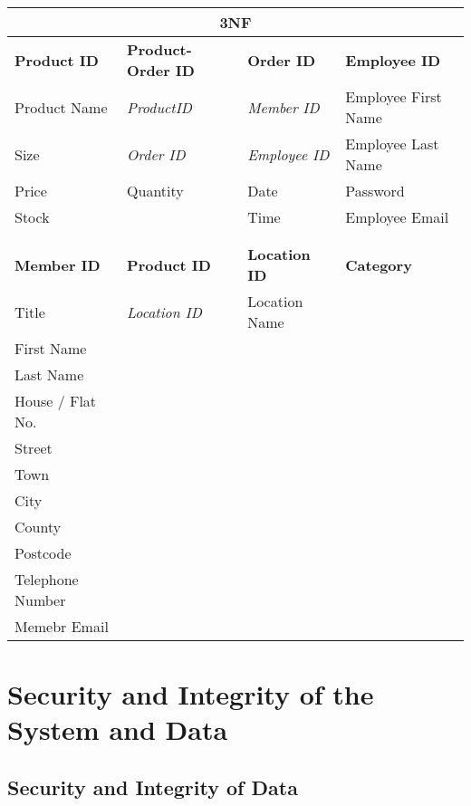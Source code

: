 \begin{flushleft}
\begin{center}
    \begin{tabular}{|p{3cm}|p{3cm}|p{3cm}|p{2cm}|}
        \hline
	 \multicolumn{4}{|c|}{3NF} \\ \hline
	\textbf{Product ID}  & \textbf{Product-Order ID} & \textbf{Order ID} & \textbf{Employee ID} \\ \hline
	{Product Name} & \textit{ProductID} & \textit{Member ID} & {Employee First Name} \\ \hline
	{Size} & \textit{Order ID} & \textit{Employee ID} & {Employee Last Name} \\ \hline
	{Price} & {Quantity} & {Date} & {Password} \\ \hline
	{Stock} & {} & {Time} & {Employee Email} \\ \hline
	{} & {} & {} & {}\\ \hline
	{} & {} & {} & {}\\ \hline
	\textbf{Member ID} & \textbf{Product ID} & \textbf{Location ID} & \textbf{Category}\\ \hline
	{Title} & \textit{Location ID} & {Location Name} & {}\\ \hline
	{First Name} & {} & {} & {}\\ \hline
	{Last Name} & {} & {} & {}\\ \hline
	{House / Flat No.} & {} & {} & {}\\ \hline
	{Street} & {} & {} & {}\\ \hline
	{Town} & {} & {} & {}\\ \hline
	{City} & {} & {} & {}\\ \hline
	{County} & {} & {} & {}\\ \hline
	{Postcode} & {} & {} & {}\\ \hline
	{Telephone Number} & {} & {} & {}\\ \hline
	{Memebr Email} & {} & {} & {}\\ \hline
    \end{tabular}
\end{center}
\end{flushleft}


\section{Security and Integrity of the System and Data}

\subsection{Security and Integrity of Data}

